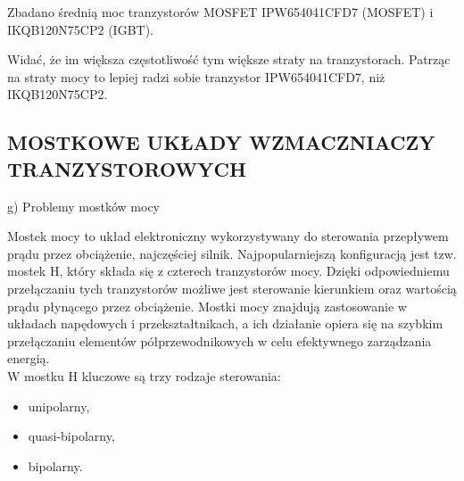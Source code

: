 \documentclass[11pt]{article}
\begin{document}
Zbadano średnią moc tranzystorów MOSFET IPW654041CFD7 (MOSFET) i IKQB120N75CP2 (IGBT). \\

\begin{table}[H]
\centering
{}
\caption{Średnia moc wytrącaną na tranzystorze w zależności od częstotliwości}
\end{table}

Widać, że im większa częstotliwość tym większe straty na tranzystorach. Patrząc na straty mocy to lepiej radzi sobie tranzystor IPW654041CFD7, niż IKQB120N75CP2.\\

\subsection{MOSTKOWE UKŁADY WZMACZNIACZY TRANZYSTOROWYCH}

g) Problemy mostków mocy

Mostek mocy to układ elektroniczny wykorzystywany do sterowania przepływem prądu przez obciążenie, najczęściej silnik. Najpopularniejszą konfiguracją jest tzw. mostek H, który składa się z czterech tranzystorów mocy. Dzięki odpowiedniemu przełączaniu tych tranzystorów możliwe jest sterowanie kierunkiem oraz wartością prądu płynącego przez obciążenie. Mostki mocy znajdują zastosowanie w układach napędowych i przekształtnikach, a ich działanie opiera się na szybkim przełączaniu elementów półprzewodnikowych w celu efektywnego zarządzania energią.\\

W mostku H kluczowe są trzy rodzaje sterowania:
\begin{itemize}
\item unipolarny,
\item quasi-bipolarny,
\item bipolarny.
\end{itemize}
\vspace{1em}
\end{document}
